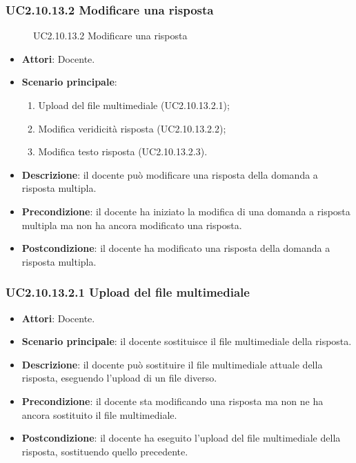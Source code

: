 \subsubsection{UC2.10.13.2 Modificare una risposta}
\begin{figure}[H]
\centering
\noindent{}
\caption{UC2.10.13.2 Modificare una risposta}
\end{figure}
\begin{itemize}
\item \textbf{Attori}: Docente.
\item \textbf{Scenario principale}:
\begin{enumerate}
\item Upload del file multimediale (UC2.10.13.2.1);
\item Modifica veridicità risposta (UC2.10.13.2.2);
\item Modifica testo risposta (UC2.10.13.2.3).
\end{enumerate}
\item \textbf{Descrizione}: il docente può modificare una risposta della domanda a risposta multipla.
\item \textbf{Precondizione}: il docente ha iniziato la modifica di una domanda a risposta multipla ma non ha ancora modificato una risposta.
\item \textbf{Postcondizione}: il docente ha modificato una risposta della domanda a risposta multipla.
\end{itemize}
\subsubsection{UC2.10.13.2.1 Upload del file multimediale}
\begin{itemize}
\item \textbf{Attori}: Docente.
\item \textbf{Scenario principale}: il docente sostituisce il file multimediale della risposta.
\item \textbf{Descrizione}: il docente può sostituire il file multimediale attuale della risposta, eseguendo l'upload di un file diverso.
\item \textbf{Precondizione}: il docente sta modificando una risposta ma non ne ha ancora sostituito il file multimediale.
\item \textbf{Postcondizione}: il docente ha eseguito l'upload del file multimediale della risposta, sostituendo quello precedente.
\end{itemize}
